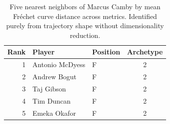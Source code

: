 \begin{table}[htbp]
  \centering\small
  \begin{tabular}{rllc}
    \toprule
    Rank & Player & Position & Archetype \\
    \midrule
    1 & Antonio McDyess & F & 2 \\
    2 & Andrew Bogut & F & 2 \\
    3 & Taj Gibson & F & 2 \\
    4 & Tim Duncan & F & 2 \\
    5 & Emeka Okafor & F & 2 \\
    \bottomrule
  \end{tabular}
  \caption{Five nearest neighbors of Marcus Camby by mean Fr\'{e}chet curve distance across metrics. Identified purely from trajectory shape without dimensionality reduction.}
  \label{tab:Marcus_Camby_frechet_curve_neighbors}
\end{table}

